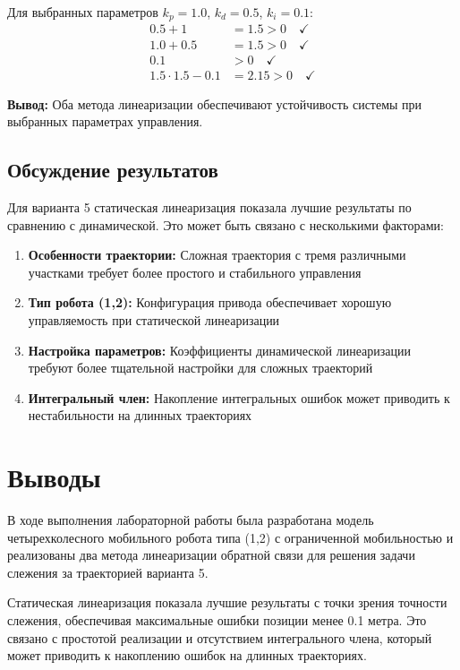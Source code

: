 Для выбранных параметров $k_p = 1.0$, $k_d = 0.5$, $k_i = 0.1$:
\begin{align}
0.5 + 1 &= 1.5 > 0 \quad \checkmark \\
1.0 + 0.5 &= 1.5 > 0 \quad \checkmark \\
0.1 &> 0 \quad \checkmark \\
1.5 \cdot 1.5 - 0.1 &= 2.15 > 0 \quad \checkmark
\end{align}

\textbf{Вывод:} Оба метода линеаризации обеспечивают устойчивость системы при выбранных параметрах управления.

\subsection{Обсуждение результатов}

Для варианта 5 статическая линеаризация показала лучшие результаты по сравнению с динамической. Это может быть связано с несколькими факторами:

\begin{enumerate}
\item \textbf{Особенности траектории:} Сложная траектория с тремя различными участками требует более простого и стабильного управления
\item \textbf{Тип робота (1,2):} Конфигурация привода обеспечивает хорошую управляемость при статической линеаризации
\item \textbf{Настройка параметров:} Коэффициенты динамической линеаризации требуют более тщательной настройки для сложных траекторий
\item \textbf{Интегральный член:} Накопление интегральных ошибок может приводить к нестабильности на длинных траекториях
\end{enumerate}

\section{Выводы}

В ходе выполнения лабораторной работы была разработана модель четырехколесного мобильного робота типа (1,2) с ограниченной мобильностью и реализованы два метода линеаризации обратной связи для решения задачи слежения за траекторией варианта 5.

Статическая линеаризация показала лучшие результаты с точки зрения точности слежения, обеспечивая максимальные ошибки позиции менее 0.1 метра. Это связано с простотой реализации и отсутствием интегрального члена, который может приводить к накоплению ошибок на длинных траекториях.

